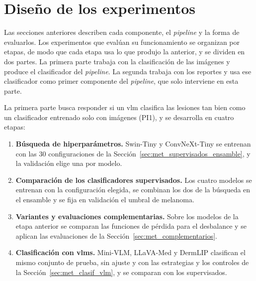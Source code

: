 \section{Diseño de los experimentos}
\label{sec:met_diseno}

Las secciones anteriores describen cada componente, el \emph{pipeline} y la forma de evaluarlos. Los experimentos que
evalúan su funcionamiento se organizan por etapas, de modo que cada etapa usa lo que produjo la anterior, y se dividen
en dos partes. La primera parte trabaja con la clasificación de las imágenes y produce el clasificador del
\emph{pipeline}. La segunda trabaja con los reportes y usa ese clasificador como primer componente del
\emph{pipeline}, que solo interviene en esta parte.

La primera parte busca responder si un \gls{vlm} clasifica las lesiones tan bien como un clasificador entrenado solo con
imágenes (PI1), y se desarrolla en cuatro etapas:
\begin{enumerate}[leftmargin=1.6em]
    \item \textbf{Búsqueda de hiperparámetros.} Swin-Tiny y ConvNeXt-Tiny se entrenan con las 30 configuraciones de
    la Sección~\ref{sec:met_supervisados_ensamble}, y la validación elige una por modelo.
    \item \textbf{Comparación de los clasificadores supervisados.} Los cuatro modelos se entrenan con la configuración
    elegida, se combinan los dos de la búsqueda en el ensamble y se fija en validación el umbral de melanoma.
    \item \textbf{Variantes y evaluaciones complementarias.} Sobre los modelos de la etapa anterior se comparan las
    funciones de pérdida para el desbalance y se aplican las evaluaciones de la
    Sección~\ref{sec:met_complementarios}.
    \item \textbf{Clasificación con \glspl{vlm}.} Mini-VLM, LLaVA-Med y DermLIP clasifican el mismo conjunto de prueba,
    sin ajuste y con las estrategias y los controles de la Sección~\ref{sec:met_clasif_vlm}, y se comparan con los
    supervisados.
\end{enumerate}

